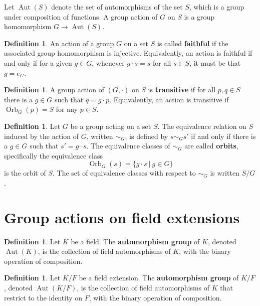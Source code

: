 \documentclass[12pt]{report}
\numberwithin{equation}{section}
\numberwithin{theorem}{chapter}
\theoremstyle{definition}
\newtheorem{definition}[theorem]{Definition}
\newtheorem*{basic properties}{Basic Properties}
\newtheorem*{Important Remark}{Important Remark}
\DeclareMathOperator{\Aut}{Aut}
\DeclareMathOperator{\Orb}{Orb}
\begin{document}
Let $\Aut(S)$ denote the set of automorphisms of the set $S$, which is a group under composition of functions.
A group action of $G$ on $S$ is a group homomorphism $G \to \Aut(S)$. 


\begin{definition}
 An action of a group $G$ on a set $S$ is called {\bf faithful} if the associated group homomorphism is injective. Equivalently, an action is faithful if and only if for a given $g \in G$, whenever $g \cdot s = s$ for all $s \in S$, it must be that $g = e_G$. 
\end{definition}

\begin{definition}
A group action of $(G, \cdot)$ on $S$ is {\bf transitive} if for all $p,q \in S$ there is a $g \in G$ such that $q=g\cdot p$. Equivalently, an action is transitive if  $\Orb_G(p)=S$ for any $p\in S$.
\end{definition}


\begin{definition}\index{$\Orb_G(s)$}
 Let $G$ be a group acting on a set $S$. The equivalence relation on $S$ induced by the action of $G$, written $\sim_G$, is defined by $s \sim_G s'$ if and only if there is a $g \in G$ such that $s'=g\cdot s$. The equivalence classes of $\sim_G$ are called {\bf orbits}, specifically the equivalence class
 $$\Orb_G(s)=\{g\cdot s \ | \ g\in G\}$$ is the orbit of $S$. The set of equivalence classes with respect to $\sim_G$ is written $S/G$.
 \end{definition}


\section{Group actions on field extensions}

\begin{definition}
Let $K$ be a field. The {\bf automorphism group} of $K$, denoted $\Aut(K)$, is the collection of field automorphisms of $K$, with the binary operation of composition.\index{$\Aut(K)$}
\end{definition}

\begin{definition}
 Let $K/F$ be a field extension. The {\bf automorphism group} of $K/F$, denoted $\Aut(K/F)$, is the collection of field automorphisms of $K$ that restrict to the identity on $F$, with the binary operation of composition.\index{$\Aut(K/F)$}
 \end{definition}
 
\end{document}
